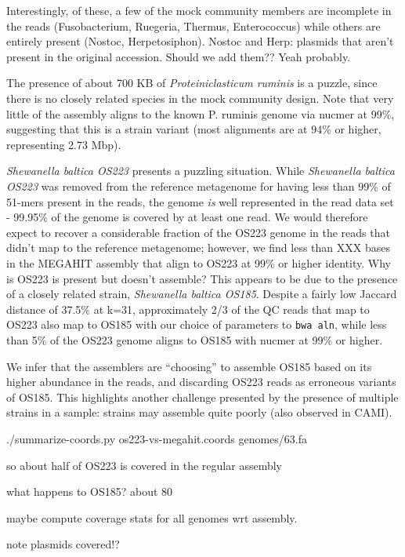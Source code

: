 \documentclass[10pt,a4paper,twocolumn]{article}
\begin{document}
Interestingly, of these, a few of the mock community members are
incomplete in the reads (Fusobacterium, Ruegeria, Thermus,
Enterococcus) while others are entirely present (Nostoc,
Herpetosiphon).  Nostoc and Herp: plasmids that aren't present in the
original accession. Should we add them?? Yeah probably.

The presence of about 700 KB of {\em Proteiniclasticum ruminis} is a puzzle,
since there is no closely related species in the mock community design.
Note that very little of the assembly aligns to the known P. ruminis
genome via nucmer at 99\%, suggesting that this is a strain variant
(most alignments are at 94\% or higher, representing 2.73 Mbp).

{\em Shewanella baltica OS223} presents a puzzling situation.  While
{\em Shewanella baltica OS223} was removed from the reference
metagenome for having less than 99\% of 51-mers present in the reads,
the genome {\em is} well represented in the read data set - 99.95\% of
the genome is covered by at least one read.  We would therefore expect
to recover a considerable fraction of the OS223 genome in the reads
that didn't map to the reference metagenome; however, we find less
than XXX bases in the MEGAHIT assembly that align to OS223 at 99\% or
higher identity.  Why is OS223 is present but doesn't assemble?  This
appears to be due to the presence of a closely related strain, {\em
  Shewanella baltica OS185}.  Despite a fairly low Jaccard distance of
37.5\% at k=31, approximately 2/3 of the QC reads that map to OS223
also map to OS185 with our choice of parameters to {\tt bwa aln},
while less than 5\% of the OS223 genome aligns to OS185 with nucmer
at 99\% or higher.

We infer that the assemblers are ``choosing'' to assemble OS185 based
on its higher abundance in the reads, and discarding OS223 reads as
erroneous variants of OS185.  This highlights another
challenge presented by the presence of multiple strains in a sample:
strains may assemble quite poorly (also observed in CAMI).

./summarize-coords.py os223-vs-megahit.coords genomes/63.fa

so about half of OS223 is covered in the regular assembly

what happens to OS185? about 80%

maybe compute coverage stats for all genomes wrt assembly.

note plasmids covered!?
\end{document}
